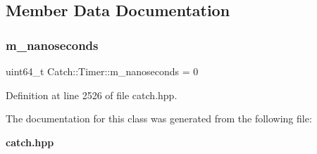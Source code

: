 \subsection{Member Data Documentation}
\mbox{\label{class_catch_1_1_timer_ac13c1ef867cc3b9f942032d5ed79c2a7}} 
\subsubsection{m\_nanoseconds}
{\footnotesize\ttfamily uint64\+\_\+t Catch\+::\+Timer\+::m\+\_\+nanoseconds = 0\hspace{0.3cm}{\ttfamily [private]}}



Definition at line 2526 of file catch.\+hpp.



The documentation for this class was generated from the following file\+:\begin{DoxyCompactItemize}
\item 
\textbf{ catch.\+hpp}\end{DoxyCompactItemize}
